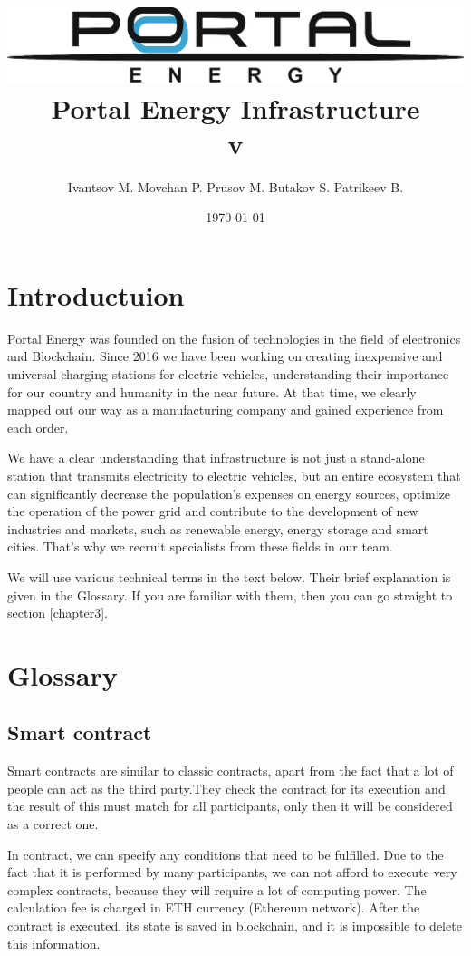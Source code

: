 \documentclass[a4paper,12pt]{report}
\title{\includegraphics[width=14cm]{logo}\\[2cm]Portal Energy Infrastructure \\\normalsize v\versionnumber}
\author{Ivantsov M. Movchan P. Prusov M. Butakov S. Patrikeev B.}
\date{\today}
\begin{document}
%
\maketitle
\tableofcontents
\clearpage


\chapter{Introductuion}

Portal Energy was founded on the fusion of technologies in the field of electronics and Blockchain. Since 2016  we have been working on creating inexpensive and universal charging stations  for electric vehicles, understanding   their importance  for our country and humanity in the near future. At that time, we clearly mapped out our way  as a manufacturing  company and gained experience from each order.

We have a clear understanding that infrastructure is not just a stand-alone station that transmits electricity to electric vehicles, but an entire ecosystem that can significantly decrease the  population's  expenses   on energy sources, optimize the operation of the power grid  and contribute to the development of new industries and markets, such as renewable energy, energy storage  and smart cities. That's  why  we recruit specialists from these fields  in  our team.

We will use various technical terms in the text below. Their brief explanation is given in the Glossary. If you are familiar with them, then  you can go straight to section \ref{chapter3}.


\chapter{Glossary}

\section{Smart contract}
Smart contracts are similar to classic contracts, apart from the fact that a lot of people can act as the  third party.They check the contract for its execution and the result of this must match for all participants, only then it will be considered as a correct one.

In contract, we can specify any conditions that need to be fulfilled. Due to the fact that it is performed by many participants, we can not afford to execute very complex contracts, because they will require a lot of computing power. The calculation fee is charged in ETH currency  (Ethereum network). After the contract is executed, its state is saved in blockchain, and it is impossible to delete this information.
\end{document}
